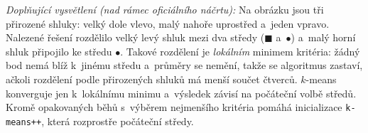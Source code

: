 \medskip
\noindent\textit{Doplňující vysvětlení (nad rámec oficiálního náčrtu):} Na obrázku jsou tři přirozené shluky: velký dole vlevo, malý nahoře uprostřed a~jeden vpravo. Nalezené řešení rozdělilo velký levý shluk mezi dva středy ($\blacksquare$ a~$\bullet$) a~malý horní shluk připojilo ke středu $\bullet$. Takové rozdělení je \emph{lokálním} minimem kritéria: žádný bod nemá blíž k~jinému středu a~průměry se nemění, takže se algoritmus zastaví, ačkoli rozdělení podle přirozených shluků má menší součet čtverců. $k$-means konverguje jen k~lokálnímu minimu a~výsledek závisí na počáteční volbě středů. Kromě opakovaných běhů s~výběrem nejmenšího kritéria pomáhá inicializace \texttt{k-means++}, která rozprostře počáteční středy.
